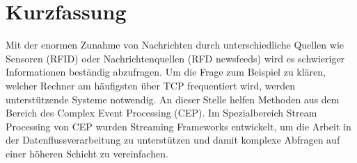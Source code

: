 

\section*{Kurzfassung}
Mit der enormen Zunahme von Nachrichten durch unterschiedliche Quellen wie Sensoren (RFID) oder 
Nachrichtenquellen (RFD newsfeeds) wird es schwieriger Informationen beständig abzufragen. Um die
Frage zum Beispiel zu klären, welcher Rechner am häufigsten über TCP frequentiert wird, werden unterstützende 
Systeme notwendig. An dieser Stelle helfen Methoden aus dem Bereich des Complex Event Processing (CEP).
Im Spezialbereich Stream Processing von CEP wurden Streaming Frameworks entwickelt, 
um die Arbeit in der Datenflussverarbeitung zu unterstützen und damit komplexe Abfragen auf einer höheren
Schicht zu vereinfachen.

